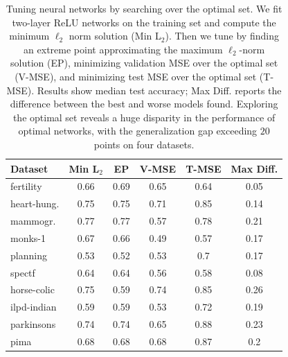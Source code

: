 
\setlength{\tabcolsep}{2.5pt}
\begin{table}[t]
	\centering
	\caption{Tuning neural networks by searching over the optimal set.
		We fit two-layer ReLU networks on the training set and
		compute the minimum \( \ell_2 \) norm solution (Min L$_2$).
		Then we tune by finding an extreme point approximating
		the maximum \( \ell_2 \)-norm solution (EP), minimizing validation
		MSE over the optimal set (V-MSE), and minimizing test MSE over
		the optimal set (T-MSE).
		Results show median test accuracy;
		Max Diff. reports the difference between the best and worse models
		found.
		Exploring the optimal set reveals a huge disparity in the performance
		of optimal networks, with the generalization gap exceeding \( 20 \)
		points on four datasets.
	}
	\label{table:tuning-small}
	\vspace{0.1in}
	\begin{tabular}{lccccc} \toprule
		\textbf{Dataset} & \textbf{Min L$_2$} & \textbf{EP} & \textbf{V-MSE} & \textbf{T-MSE} & \textbf{Max Diff.} \\
		\midrule
		fertility        & 0.66               & 0.69        & 0.65           & 0.64           & 0.05               \\
		heart-hung.      & 0.75               & 0.75        & 0.71           & 0.85           & 0.14               \\
		mammogr.         & 0.77               & 0.77        & 0.57           & 0.78           & 0.21               \\
		monks-1          & 0.67               & 0.66        & 0.49           & 0.57           & 0.17               \\
		planning         & 0.53               & 0.52        & 0.53           & 0.7            & 0.17               \\
		spectf           & 0.64               & 0.64        & 0.56           & 0.58           & 0.08               \\
		horse-colic      & 0.75               & 0.59        & 0.74           & 0.85           & 0.26               \\
		ilpd-indian      & 0.59               & 0.59        & 0.53           & 0.72           & 0.19               \\
		parkinsons       & 0.74               & 0.74        & 0.65           & 0.88           & 0.23               \\
		pima             & 0.68               & 0.68        & 0.68           & 0.87           & 0.2                \\
		\bottomrule
	\end{tabular}
\end{table}
